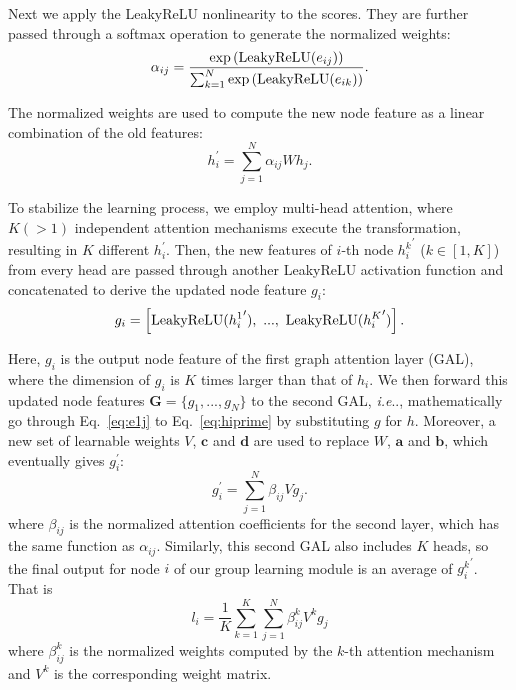 \documentclass[VANCOUVER,STIX1COL]{WileyNJD-v2}
\makeatletter
\DeclareRobustCommand\onedot{\futurelet\@let@token\@onedot}
\def\@onedot{\ifx\@let@token.\else.\null\fi\xspace}
\def\ie{\emph{i.e}\onedot}
\makeatother
\begin{document}
Next we apply the LeakyReLU nonlinearity to the scores. They are further passed through a softmax operation to generate the normalized weights:
\begin{equation}
    \alpha_{ij} = \frac{{\rm exp}\left({\rm LeakyReLU}(e_{ij})\right)}{\sum_{k=1}^{N}{\rm exp}\left({\rm LeakyReLU}(e_{ik})\right)}.
\end{equation}

The normalized weights are used to compute the new node feature as a linear combination of the old features:
\begin{equation}
  \label{eq:hiprime}
  h_i^{\prime} = \sum\limits_{j=1}^{N} \alpha_{ij}W h_j.
\end{equation}

To stabilize the learning process, we employ multi-head attention, where $K (>1)$ independent attention mechanisms execute the transformation, resulting in $K$ different $h_i^{\prime}$. Then, the new features of $i$-th node ${h_i^k}^{\prime}$  ($k \in \left[1, K\right]$) from every head are passed through another LeakyReLU activation function and concatenated to derive the updated node feature $g_i$:
\begin{equation}
  g_i = \left[ {\rm LeakyReLU}({h_i^1}^{\prime}),\ ...,\ {\rm LeakyReLU}({h_i^K}^{\prime}) \right].
\end{equation}

Here, $g_i$ is the output node feature of the first graph attention layer (GAL), where the dimension of $g_i$ is $K$ times larger than that of $h_i$. We then forward this updated node features $\mathbf{G} = \{g_1, ..., g_N\}$ to the second GAL, \ie, mathematically go through Eq.~\ref{eq:e1j} to Eq.~\ref{eq:hiprime} by substituting $g$ for $h$. Moreover, a new set of learnable weights $V$, $\mathbf{c}$ and $\mathbf{d}$ are used to replace $W$, $\mathbf{a}$ and $\mathbf{b}$, which eventually gives $g_i^{\prime}$:
\begin{equation}
  g_i^{\prime} = \sum\limits_{j=1}^{N} \beta_{ij}V g_j.
\end{equation}
where $\beta_{ij}$ is the normalized attention coefficients for the second layer, which has the same function as $\alpha_{ij}$. Similarly, this second GAL also includes $K$ heads, so the final output for node $i$ of our group learning module is an average of ${g_i^k}^{\prime}$. That is
\begin{equation}
  l_i = \frac{1}{K}\sum\limits_{k=1}^K \sum\limits_{j=1}^N \beta_{ij}^k V^k g_j
\end{equation}
where $\beta_{ij}^k$ is the normalized weights computed by the $k$-th attention mechanism and $V^k$ is the corresponding weight matrix.
\end{document}
